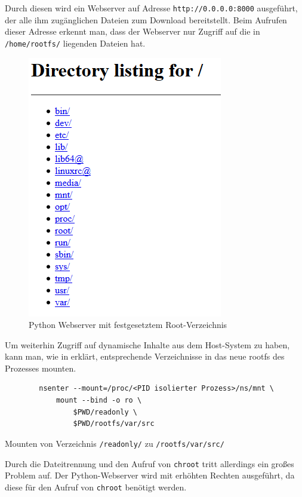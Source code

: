Durch diesen wird ein Webserver auf Adresse \texttt{http://0.0.0.0:8000} ausgeführt, der alle ihm zugänglichen Dateien zum Download bereitstellt. Beim Aufrufen dieser Adresse erkennt man, dass der Webserver nur Zugriff auf die in \texttt{/home/rootfs/} liegenden Dateien hat.

\begin{figure}[H]
	\begin{center}
		\includegraphics[scale=0.8]{bilder/chroot-python-webserver.png}
		\caption{Python Webserver mit festgesetztem Root-Verzeichnis}
		\label{fig:chrootPythonWebserver}
	\end{center}
\end{figure}

Um weiterhin Zugriff auf dynamische Inhalte aus dem Host-System zu haben, kann man, wie in  erklärt, entsprechende Verzeichnisse in das neue rootfs des Prozesses mounten.

\begin{listing}[h]
	\begin{verbatim}
		nsenter --mount=/proc/<PID isolierter Prozess>/ns/mnt \
			mount --bind -o ro \
				$PWD/readonly \
				$PWD/rootfs/var/src
	\end{verbatim}
	\caption{Mounten von Verzeichnis \texttt{/readonly/} zu \texttt{/rootfs/var/src/}}
\end{listing}

Durch die Dateitrennung und den Aufruf von \texttt{chroot} tritt allerdings ein großes Problem auf. Der Python-Webserver wird mit erhöhten Rechten ausgeführt, da diese für den Aufruf von \texttt{chroot} benötigt werden.

